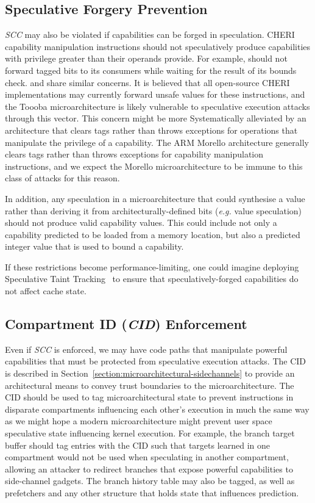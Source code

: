 \subsection{Speculative Forgery Prevention}
\emph{SCC} may also be violated if capabilities can be forged in speculation.
CHERI capability manipulation instructions should not speculatively produce capabilities with privilege greater than their operands provide.
For example,  should not forward tagged bits to its consumers while waiting for the result of its bounds check.
 and  share similar concerns.
It is believed that all open-source CHERI implementations may currently forward unsafe values for these instructions, and the Toooba microarchitecture is likely vulnerable to speculative execution attacks through this vector.
This concern might be more Systematically alleviated by an architecture that clears tags rather than throws exceptions for operations that manipulate the privilege of a capability. The ARM Morello architecture generally clears tags rather than throws exceptions for capability manipulation instructions, and we expect the Morello microarchitecture to be immune to this class of attacks for this reason.

In addition, any speculation in a microarchitecture that could synthesise a value rather than deriving it from architecturally-defined bits (\textit{e.g.} value speculation) should not produce valid capability values.
This could include not only a capability predicted to be loaded from a memory location, but also a predicted integer value that is used to bound a capability.

If these restrictions become performance-limiting, one could imagine deploying Speculative Taint Tracking~\cite{yu2019speculative} to ensure that speculatively-forged capabilities do not affect cache state.

\subsection{Compartment ID (\emph{CID}) Enforcement}
Even if \emph{SCC} is enforced, we may have code paths that manipulate powerful capabilities that must be protected from speculative execution attacks.
The CID is described in Section~\ref{section:microarchitectural-sidechannels} to provide an architectural means to convey trust boundaries to the microarchitecture.
The CID should be used to tag microarchitectural state to prevent instructions in disparate compartments influencing each other's execution in much the same way as we might hope a modern microarchitecture might prevent user space speculative state influencing kernel execution.
For example, the branch target buffer should tag entries with the CID such that targets learned in one compartment would not be used when speculating in another compartment, allowing an attacker to redirect branches that expose powerful capabilities to side-channel gadgets.
The branch history table may also be tagged, as well as prefetchers and any other structure that holds state that influences prediction.

